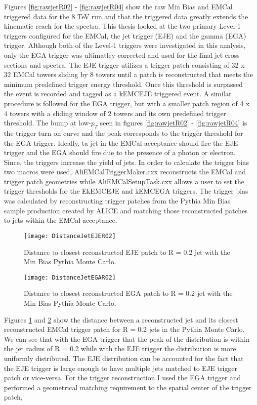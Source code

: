 Figures \ref{fig:rawjetR02} - \ref{fig:rawjetR04} show the raw Min Bias and EMCal triggered data for the 8 TeV run and that the triggered data greatly extends the kinematic reach for the spectra.  This thesis looked at the two primary Level-1 triggers configured for the EMCal, the jet trigger (EJE) and the gamma (EGA) trigger\cite{Bourrion:2010js}.  Although both of the Level-1 triggers were investigated in this analysis, only the EGA trigger was ultimatley corrected  and used for the final jet cross sections and spectra.  The EJE trigger utilizes a trigger patch consisting of 32 x 32 EMCal towers sliding by 8 towers until a patch is reconstructed that meets the minimum predefined trigger energy threshold.  Once this threshold is surpassed the event is recorded and tagged as a kEMCEJE triggered event.  A similar procedure is followed for the EGA trigger, but with a smaller patch region of 4 x 4 towers with a sliding window of 2 towers and its own predefined trigger threshold.  The bump at low-$p_{T}$ seen in figures \ref{fig:rawjetR02} - \ref{fig:rawjetR04} is the trigger turn on curve and the peak corresponds to the trigger threshold for the EGA trigger.  Ideally, ta jet in the EMCal acceptance should fire the EJE trigger and the EGA should fire due to the presence of a photon or electron.  Since, the triggers increase the yield of jets.  In order to calculate the trigger bias two macros were used, AliEMCalTriggerMaker.cxx reconstructs the EMCal and trigger patch geometries while AliEMCalSetupTask.cxx allows a user to set the trigger thresholds for the EkEMCEJE and kEMCEGA triggers.  The trigger bias was calculated by reconstructing trigger patches from the Pythia Min Bias sample production created by ALICE and matching those reconstructed patches to jets within the EMCal acceptance.  

\begin{figure}[h]
\texttt{[image: DistanceJetEJER02]}
\centering
\caption{Distance to closest reconstructed EJE patch to R = 0.2 jet with the Min Bias Pythia Monte Carlo.}
\label{fig:DisJetEJE}
\end{figure}

\begin{figure}[h]
\texttt{[image: DistanceJetEGAR02]}
\centering
\caption{Distance to closest reconstructed EGA patch to R = 0.2 jet with the Min Bias Pythia Monte Carlo.}
\label{fig:DisJetEGA}
\end{figure}

\noindent
Figures \ref{fig:DisJetEJE} and \ref{fig:DisJetEGA} show the distance between a reconstructed jet and its closest reconstructed EMCal trigger patch for R = 0.2 jets in the Pythia Monte Carlo.  We can see that with the EGA trigger that the peak of the distribution is within the jet radius of R = 0.2 while with the EJE trigger the distribution is more uniformly distributed.  The EJE distribution can be accounted for the fact that the EJE trigger is large enough to have multiple jets matched to EJE trigger patch or vice-versa.  For the trigger reconstruction I used the EGA trigger and performed a geometrical matching requirement to the spatial center of the trigger patch,

